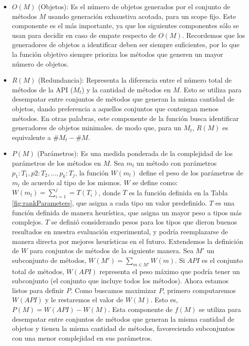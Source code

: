\begin{itemize}
    \item $O(M)$ (Objetos): Es el número de objetos generados por el conjunto de métodos $M$ usando generación exhaustiva acotada, para un scope fijo. Este componente es el más importante, ya que los siguientes componentes sólo se usan para decidir en caso de empate respecto de $O(M)$. Recordemos que los generadores de objetos a identificar deben ser siempre suficientes, por lo que la función objetivo siempre prioriza los métodos que generen un mayor número de objetos.
    \item $R(M)$ (Redundancia): Representa la diferencia entre el número total de métodos de la API ($M_t$) y la cantidad de métodos en $M$. Esto se utiliza para desempatar entre conjuntos de métodos que generan la misma cantidad de objetos, dando preferencia a aquellos conjuntos que contengan menos métodos. En otras palabras, este componente de la función busca identificar generadores de objetos minimales.
        de modo que, para un $M_t$, $R(M)$ es equivalente a $\#M_t - \#M$.
    \item $P(M)$ (Parámetros): Es una medida ponderada de la complejidad de los
        parámetros de los métodos en $M$. Sea $m_l$ un método con parámetros $p_1: T_1,
            p2: T_2, \ldots, p_k: T_j$, la función $W(m_l)$ define el peso de los
            parámetros de $m_l$ de acuerdo al tipo de los mismos. $W$ se
            define como: $W(m_l) = \sum_{i=1}^j = T(T_i)$, donde $T$ es la función
            definida en la Tabla \ref{fig:rankParameters}, que asigna a cada
            tipo un valor predefinido. $T$ es una función definida de manera heurística, 
            que asigna un mayor peso a tipos más complejos. $T$ se definió 
            considerando pesos para los tipos que dieron buenos resultados en
            nuestra evaluación experimental, y podría reemplazarse de manera
            directa por mejores heurísticas en el futuro. Extendemos la
            definición de $W$ para conjuntos de métodos de la siguiente manera.
            Sea $M'$ un subconjunto de métodos, $W(M') = \sum_{m \in M'} W(m)$.
            Si $API$ es el conjunto total de métodos, $W(API)$ representa
            el peso máximo que podría tener un subconjunto (el conjunto que
            incluye todos los métodos). 
            Ahora estamos listos para definir $P$. Como buscamos maximizar $P$, 
            primero computaremos $W(API)$ y le restaremos el valor de $W(M)$. 
            Esto es, $P(M) = W(API) - W(M)$. Esta componente de $f(M)$ se
            utiliza para desempatar entre conjuntos de métodos que generan la
            misma cantidad de objetos y tienen la misma cantidad de métodos,
            favoreciendo subconjuntos con una menor complejidad en sus
        parámetros.


\end{itemize}


